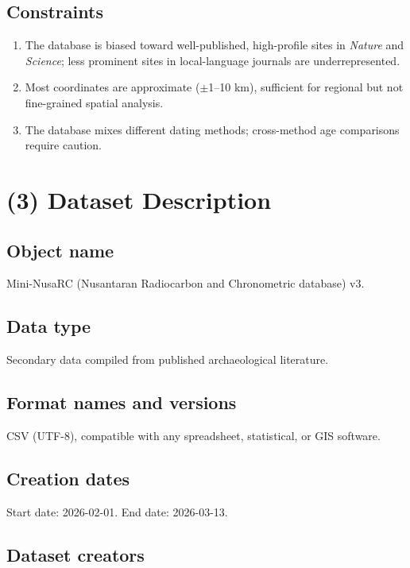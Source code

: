 \documentclass[11pt]{article}
\begin{document}
\subsection{Constraints}

\begin{enumerate}
    \item The database is biased toward well-published, high-profile sites in \textit{Nature} and \textit{Science}; less prominent sites in local-language journals are underrepresented.
    \item Most coordinates are approximate ($\pm$1--10 km), sufficient for regional but not fine-grained spatial analysis.
    \item The database mixes different dating methods; cross-method age comparisons require caution.
\end{enumerate}

\section{(3) Dataset Description}

\subsection{Object name}

Mini-NusaRC (Nusantaran Radiocarbon and Chronometric database) v3.

\subsection{Data type}

Secondary data compiled from published archaeological literature.

\subsection{Format names and versions}

CSV (UTF-8), compatible with any spreadsheet, statistical, or GIS software.

\subsection{Creation dates}

Start date: 2026-02-01. End date: 2026-03-13.

\subsection{Dataset creators}
\end{document}
